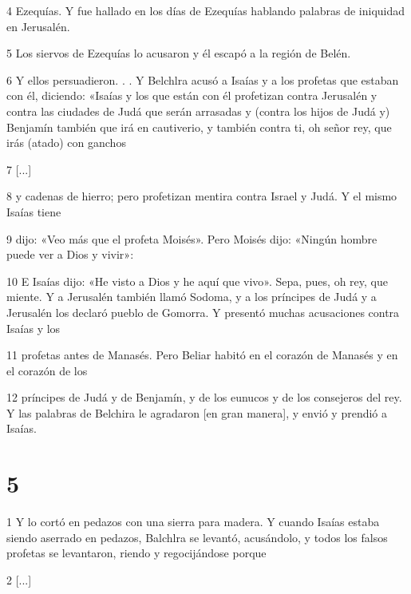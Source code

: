 \par 4 Ezequías. Y fue hallado en los días de Ezequías hablando palabras de iniquidad en Jerusalén.

\par 5 Los siervos de Ezequías lo acusaron y él escapó a la región de Belén.

\par 6 Y ellos persuadieron. . . Y Belchlra acusó a Isaías y a los profetas que estaban con él, diciendo: «Isaías y los que están con él profetizan contra Jerusalén y contra las ciudades de Judá que serán arrasadas y (contra los hijos de Judá y) Benjamín también que irá en cautiverio, y también contra ti, oh señor rey, que irás (atado) con ganchos

\par 7 [...]

\par 8 y cadenas de hierro; pero profetizan mentira contra Israel y Judá. Y el mismo Isaías tiene

\par 9 dijo: «Veo más que el profeta Moisés». Pero Moisés dijo: «Ningún hombre puede ver a Dios y vivir»:

\par 10 E Isaías dijo: «He visto a Dios y he aquí que vivo». Sepa, pues, oh rey, que miente. Y a Jerusalén también llamó Sodoma, y ​​a los príncipes de Judá y a Jerusalén los declaró pueblo de Gomorra. Y presentó muchas acusaciones contra Isaías y los

\par 11 profetas antes de Manasés. Pero Beliar habitó en el corazón de Manasés y en el corazón de los

\par 12 príncipes de Judá y de Benjamín, y de los eunucos y de los consejeros del rey. Y las palabras de Belchira le agradaron [en gran manera], y envió y prendió a Isaías.

\chapter{5}

\par 1 Y lo cortó en pedazos con una sierra para madera. Y cuando Isaías estaba siendo aserrado en pedazos, Balchlra se levantó, acusándolo, y todos los falsos profetas se levantaron, riendo y regocijándose porque

\par 2 [...]


